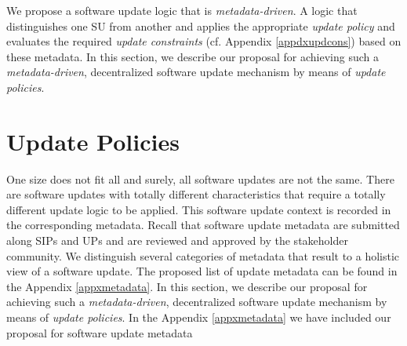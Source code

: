 {We propose a software update logic that is \emph{metadata-driven}. A logic that distinguishes one SU from another and applies the appropriate \emph{update policy} and evaluates the required \emph{update constraints} (cf. Appendix \ref{appdxupdcons}) based on these metadata. 
In this section, we describe our proposal for achieving such a \emph{metadata-driven}, decentralized software update mechanism by means of \emph{update policies}.


}

\section{Update Policies}
One size does not fit all and surely, all software updates are not the same. There are software updates with totally different characteristics that require a totally different update logic to be applied. This software update context is recorded in the corresponding metadata.  Recall that software update metadata are submitted along SIPs and UPs and are reviewed and approved by the stakeholder community. We distinguish several categories of metadata that result to a holistic view of a software update. The proposed list of update metadata can be found in the Appendix \ref{appxmetadata}. In this section, we describe our proposal for achieving such a \emph{metadata-driven}, decentralized software update mechanism by means of \emph{update policies}. In the Appendix \ref{appxmetadata} we have included our proposal for software update metadata 

